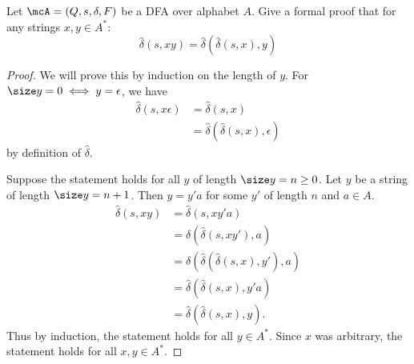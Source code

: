 \documentclass[12pt]{article}
\begin{document}
\begin{problem}
    Let $\mcA = (Q, s, \delta, F)$ be a DFA over alphabet $A$.
    Give a formal proof that for any strings $x, y \in A^*$: \[
        \widehat{\delta}(s, xy)
            = \widehat{\delta}(\widehat{\delta}(s, x), y)
    \]
\end{problem}
\begin{proof}
    We will prove this by induction on the length of $y$.
    For $\size y = 0 \iff y = \epsilon$, we have \begin{align*}
        \widehat{\delta}(s, x\epsilon)
            &= \widehat{\delta}(s, x) \\
            &= \widehat{\delta}(\widehat{\delta}(s, x), \epsilon)
    \end{align*} by definition of $\widehat\delta$.

    Suppose the statement holds for all $y$ of length $\size y = n \geq 0$.
    Let $y$ be a string of length $\size y = n + 1$.
    Then $y = y' a$ for some $y'$ of length $n$ and $a \in A$.
    \begin{align*}
        \widehat{\delta}(s, xy)
            &= \widehat{\delta}(s, xy'a) \\
            &= \delta(\widehat{\delta}(s, xy'), a) \tag{definition} \\
            &= \delta(\widehat{\delta}(\widehat{\delta}(s, x), y'), a)
                \tag{induction hypothesis} \\
            &= \widehat{\delta}(\widehat{\delta}(s, x), y'a) \tag{definition} \\
            &= \widehat{\delta}(\widehat{\delta}(s, x), y).
    \end{align*}
    Thus by induction, the statement holds for all $y \in A^*$.
    Since $x$ was arbitrary, the statement holds for all $x, y \in A^*$.
\end{proof}
\end{document}
